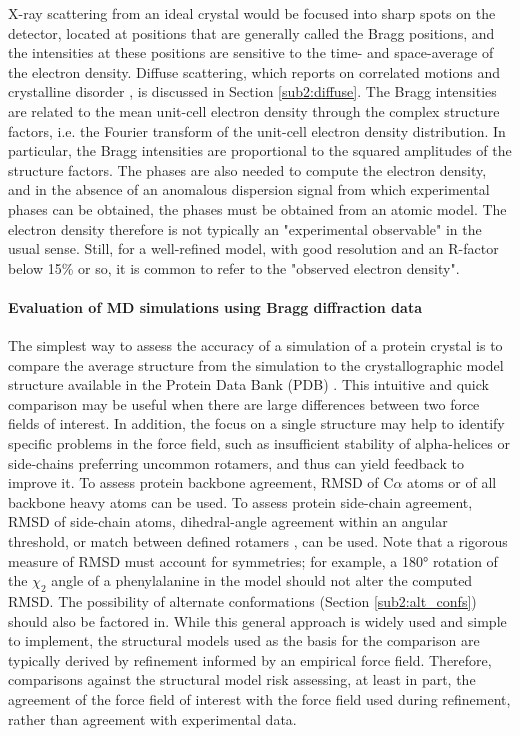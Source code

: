 \documentclass[9pt,review]{livecoms}
\begin{document}
X-ray scattering from an ideal crystal would be focused into sharp spots on the detector, located at positions that are generally called the Bragg positions, and the intensities at these positions are sensitive to the time- and space-average of the electron density.
Diffuse scattering, which reports on correlated motions and crystalline disorder \cite{meisburger_x-ray_2017}, is discussed in Section \ref{sub2:diffuse}.
The Bragg intensities are related to the mean unit-cell electron density through the complex structure factors, i.e. the Fourier transform of the unit-cell electron density distribution.
In particular, the Bragg intensities are proportional to the squared amplitudes of the structure factors.
The phases are also needed to compute the electron density, and in the absence of an anomalous dispersion signal from which experimental phases can be obtained, the phases must be obtained from an atomic model.
The electron density therefore is not typically an "experimental observable" in the usual sense.
Still, for a well-refined model, with good resolution and an R-factor below 15\% or so, it is common to refer to the "observed electron density".

\paragraph{Evaluation of MD simulations using Bragg diffraction data}

The simplest way to assess the accuracy of a simulation of a protein crystal is to compare the average structure from the simulation to the crystallographic model structure available in the Protein Data Bank (PDB) \cite{bernstein_protein_1977,berman_protein_2000,rose_rcsb_2015}.
This intuitive and quick comparison may be useful when there are large differences between two force fields of interest.
In addition, the focus on a single structure may help to identify specific problems in the force field, such as insufficient stability of alpha-helices or side-chains preferring uncommon rotamers, and thus can yield feedback to improve it.
To assess protein backbone agreement, RMSD of C$\alpha$ atoms or of all backbone heavy atoms can be used.
To assess protein side-chain agreement, RMSD of side-chain atoms, dihedral-angle agreement within an angular threshold, or match between defined rotamers \cite{dunbrack_backbone-dependent_1993,lovell_penultimate_2000}, can be used.
Note that a rigorous measure of RMSD must account for symmetries; for example, a \ang{180} rotation of the $\chi_2$ angle of a phenylalanine in the model should not alter the computed RMSD.
The possibility of alternate conformations (Section \ref{sub2:alt_confs}) should also be factored in.
While this general approach is widely used and simple to implement, the structural models used as the basis for the comparison are typically derived by refinement informed by an empirical force field.
Therefore, comparisons against the structural model risk assessing, at least in part, the agreement of the force field of interest with the force field used during refinement, rather than agreement with experimental data.
\end{document}
